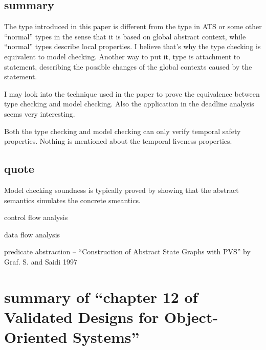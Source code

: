 \documentclass{llncs}
\begin{document}
\subsection{summary}
The type introduced in this paper is different from the type in ATS or 
some other ``normal'' types in the sense that it is based on global abstract
context, while ``normal'' types describe local properties. I believe that's
why the type checking is equivalent to model checking. Another way to put it,
type is attachment to statement, describing the possible changes of the global
contexts caused by the statement.

I may look into the technique used in the paper to prove the equivalence between
type checking and model checking. Also the application in the deadline analysis
seems very interesting.

Both the type checking and model checking can only verify temporal safety properties.
Nothing is mentioned about the temporal liveness properties.

\subsection{quote}
Model checking soundness is typically proved by showing that the abstract
semantics simulates the concrete smeantics.

control flow analysis

data flow analysis

predicate abstraction -- ``Construction of Abstract State Graphs with PVS'' by
Graf. S. and Saidi 1997






\newpage
\section{summary of ``chapter 12 of Validated Designs for 
Object-Oriented Systems''\cite{Fitzgerald2005Validated}} \label{section:vdmoo}
\end{document}
